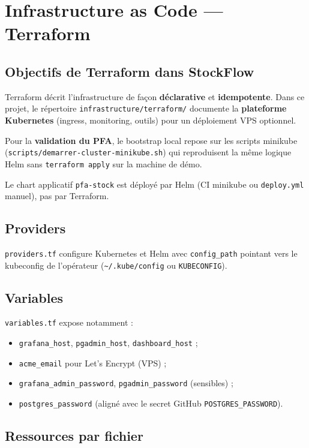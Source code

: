 \chapter{Infrastructure as Code — Terraform}
\label{ch:terraform}

\section{Objectifs de Terraform dans StockFlow}

Terraform décrit l'infrastructure de façon \textbf{déclarative} et \textbf{idempotente}. Dans ce projet, le répertoire \texttt{infrastructure/terraform/} documente la \textbf{plateforme Kubernetes} (ingress, monitoring, outils) pour un déploiement VPS optionnel.

Pour la \textbf{validation du PFA}, le bootstrap local repose sur les scripts minikube (\texttt{scripts/demarrer-cluster-minikube.sh}) qui reproduisent la même logique Helm sans \texttt{terraform apply} sur la machine de démo.

Le chart applicatif \texttt{pfa-stock} est déployé par Helm (CI minikube ou \texttt{deploy.yml} manuel), pas par Terraform.

\section{Providers}

\texttt{providers.tf} configure Kubernetes et Helm avec \texttt{config\_path} pointant vers le kubeconfig de l'opérateur (\texttt{\textasciitilde/.kube/config} ou \texttt{KUBECONFIG}).

\section{Variables}

\texttt{variables.tf} expose notamment :
\begin{itemize}
  \item \texttt{grafana\_host}, \texttt{pgadmin\_host}, \texttt{dashboard\_host} ;
  \item \texttt{acme\_email} pour Let's Encrypt (VPS) ;
  \item \texttt{grafana\_admin\_password}, \texttt{pgadmin\_password} (sensibles) ;
  \item \texttt{postgres\_password} (aligné avec le secret GitHub \texttt{POSTGRES\_PASSWORD}).
\end{itemize}

\section{Ressources par fichier}

